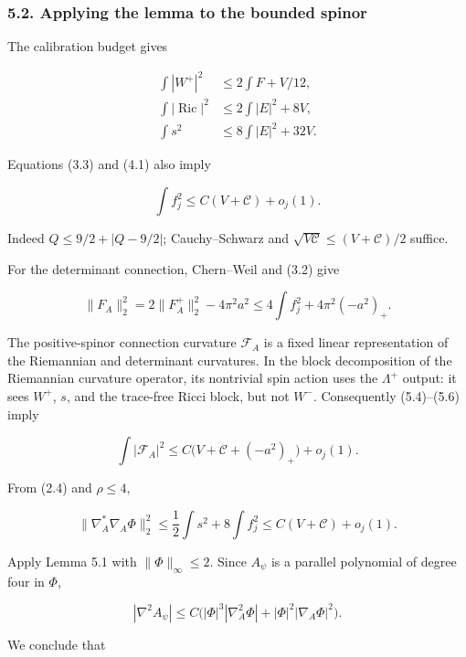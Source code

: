 \documentclass[
  11pt,
]{article}
\begin{document}
\hypertarget{applying-the-lemma-to-the-bounded-spinor}{%
\subsubsection{5.2. Applying the lemma to the bounded
spinor}\label{applying-the-lemma-to-the-bounded-spinor}}

The calibration budget gives

\[
 \begin{split}
 \int|W^+|^2&\le2\int F+V/12,\\
 \int|\operatorname{Ric}|^2&\le2\int|E|^2+8V,\\
 \int s^2&\le8\int|E|^2+32V.
 \end{split}                                              \tag{5.4}
\]

Equations (3.3) and (4.1) also imply

\[
                         \int f_j^2\le C(V+\mathcal C)+o_j(1).
 \tag{5.5}
\]

Indeed \(Q\le9/2+|Q-9/2|\); Cauchy--Schwarz and
\(\sqrt{V\mathcal C}\le(V+\mathcal C)/2\) suffice.

For the determinant connection, Chern--Weil and (3.2) give

\[
 \|F_A\|_2^2
   =2\|F_A^+\|_2^2-4\pi^2a^2
   \le4\int f_j^2+4\pi^2(-a^2)_+.
 \tag{5.6}
\]

The positive-spinor connection curvature \(\mathscr F_A\) is a fixed
linear representation of the Riemannian and determinant curvatures. In
the block decomposition of the Riemannian curvature operator, its
nontrivial spin action uses the \(\Lambda^+\) output: it sees \(W^+\),
\(s\), and the trace-free Ricci block, but not \(W^-\). Consequently
(5.4)--(5.6) imply

\[
             \int|\mathscr F_A|^2
               \le C\bigl(V+\mathcal C+(-a^2)_+\bigr)+o_j(1).
 \tag{5.7}
\]

From (2.4) and \(\rho\le4\),

\[
 \|\nabla_A^*\nabla_A\Phi\|_2^2
       \le\frac12\int s^2+8\int f_j^2
       \le C(V+\mathcal C)+o_j(1).                        \tag{5.8}
\]

Apply Lemma 5.1 with \(\|\Phi\|_\infty\le2\). Since \(A_\psi\) is a
parallel polynomial of degree four in \(\Phi\),

\[
 |\nabla^2A_\psi|
      \le C\bigl(|\Phi|^3|\nabla_A^2\Phi|
                               +|\Phi|^2|\nabla_A\Phi|^2\bigr).
\]

We conclude that
\end{document}
